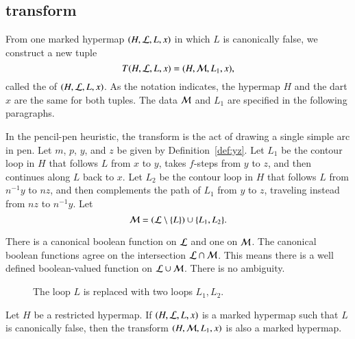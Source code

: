 \subsection{transform}

\begin{definition}[transform]
  From one marked hypermap $(H,{\cal L},L,x)$ in which $L$ is
  canonically false, we construct a new tuple
\[ 
T(H,{\cal L},L,x) = (H,{\cal M},L_1,x),
\] 
 called the  of
  $(H,{\cal{L}},L,x)$.  
As the notation indicates, the hypermap $H$ and the dart $x$ are the same for both
tuples.  The data ${\cal M}$ and $L_1$ are specified in
the following paragraphs.
\end{definition}

In the pencil-pen heuristic, the transform is the act of drawing a single simple arc in
pen.
Let $m$, $p$, $y$, and $z$ be  given by
Definition~\ref{def:yz}.
Let $L_1$ be 
the contour loop in $H$ that follows $L$ from $x$ to $y$,  takes
$f$-steps from $y$ to $z$, and then continues along $L$ back to $x$.  
Let $L_2$ be
the contour loop in $H$ that follows $L$ from $n^{-1} y$ to $n z$, and
then complements the path of $L_1$ from $y$ to $z$, traveling instead
from $n z$ to $n^{-1} y$. 
Let
\begin{equation}\label{eqn:ML} 
{\cal M} = ({\cal L}\setminus \{L\}) \cup\{L_1,L_2\}.
\end{equation}

\begin{remark}
There is a canonical boolean function on ${\cal L}$ and one on ${\cal M}$.
The canonical boolean functions agree on the intersection ${\cal L}\cap {\cal M}$.
This means there is a well defined boolean-valued function on 
${\cal L}\cup {\cal M}$.  There is no ambiguity.  
\end{remark}
%




\begin{figure}[htb]
\centering
{}
\caption{The loop $L$ is replaced with two loops $L_1, L_2$.}
\label{fig:L1L2}
\end{figure}



\begin{lemma}\label{lemma:flag} 
Let $H$ be a restricted hypermap.
If $(H,{\cal L},L,x)$ is a marked hypermap such that $L$
is canonically false,  then the transform
$(H,{\cal M},L_1,x)$ 
is also a marked hypermap.
\end{lemma}

